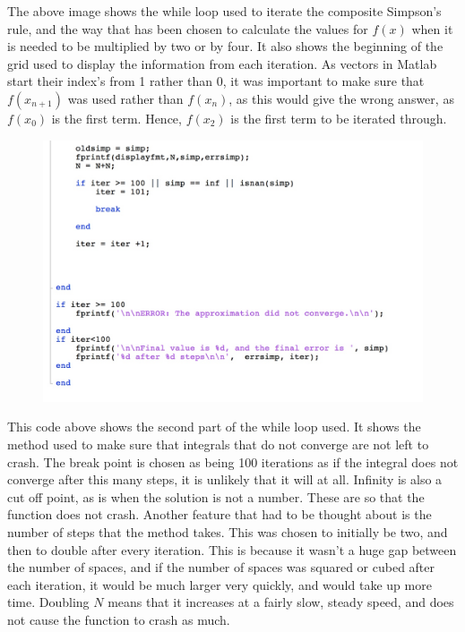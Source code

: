 \documentclass[a4paper]{article}
\begin{document}
The above image shows the while loop used to iterate the composite Simpson's rule, and the way that has been chosen to calculate the values for $f(x)$ when it is needed to be multiplied by two or by four. It also shows the beginning of the grid used to display the information from each iteration. As vectors in Matlab start their index's from 1 rather than 0, it was important to make sure that $f(x_{n+1})$ was used rather than $f(x_{n})$, as this would give the wrong answer, as $f(x_{0})$ is the first term. Hence, $f(x_{2})$ is the first term to be iterated through. 

\begin{figure}[H]
\includegraphics[width=1\textwidth]{mynumint3.jpg}
\end{figure}

This code above shows the second part of the while loop used. It shows the method used to make sure that integrals that do not converge are not left to crash. The break point is chosen as being 100 iterations as if the integral does not converge after this many steps, it is unlikely that it will at all. Infinity is also a cut off point, as is when the solution is not a number. These are so that the function does not crash. 
\newline
Another feature that had to be thought about is the number of steps that the method takes. This was chosen to initially be two, and then to double after every iteration. This is because it wasn't a huge gap between the number of spaces, and if the number of spaces was squared or cubed after each iteration, it would be much larger very quickly, and would take up more time. Doubling $N$ means that it increases at a fairly slow, steady speed, and does not cause the function to crash as much. 
\end{document}
